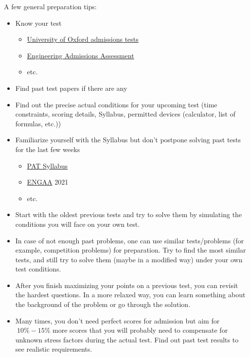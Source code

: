 \documentclass{article}
\begin{document}
A few general preparation tips:

\begin{itemize}
    \item Know your test
    \begin{itemize}
        \item \href{https://www.admissionstesting.org/for-test-takers/oxford-tests/}{University of Oxford admissions tests}
        \item \href{https://www.undergraduate.study.cam.ac.uk/courses/engineering#entry-requirements}{Engineering Admissions Assessment}
        \item etc.
    \end{itemize}
    \item Find past test papers if there are any
    \item Find out the precise actual conditions for your upcoming test (time constraints, scoring details, Syllabus, permitted devices (calculator, list of formulas, etc.))
    \item Familiarize yourself with the Syllabus but don't postpone solving past tests for the last few weeks
    \begin{itemize}
        \item \href{https://www.physics.ox.ac.uk/study/undergraduates/how-apply/physics-aptitude-test-pat/pat-syllabus}{PAT Syllabus}
        \item \href{https://www.undergraduate.study.cam.ac.uk/files/publications/engaa_specification2021.pdf}{ENGAA} 2021
        \item etc.
    \end{itemize}
    \item Start with the oldest previous tests and try to solve them by simulating the conditions you will face on your own test.
    \item In case of not enough past problems, one can use similar tests/problems (for example, competition problems) for preparation. Try to find the most similar tests, and still try to solve them (maybe in a modified way) under your own test conditions. 
    \item After you finish maximizing your points on a previous test, you can revisit the hardest questions. In a more relaxed way, you can learn something about the background of the problem or go through the solution.
    \item Many times, you don't need perfect scores for admission but aim for $~10\%-15\%$ more scores that you will probably need to compensate for unknown stress factors during the actual test. Find out past test results to see realistic requirements. 

\end{itemize}
\end{document}
